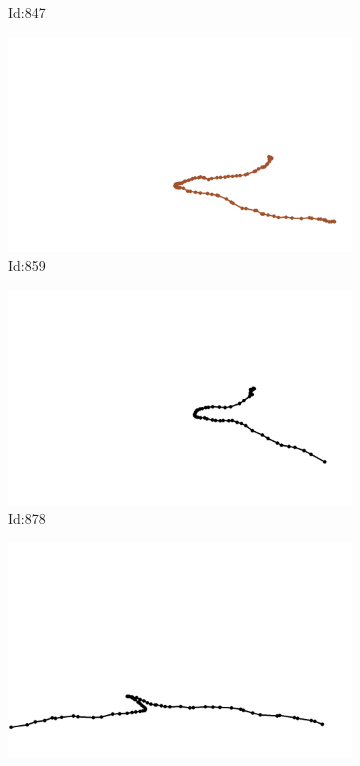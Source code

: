 \documentclass[12pt,twoside]{report}
\begin{document}
\begin{figure}
\begin{subfigure}[b]{0.20\textwidth}
\caption{Id:847}
\end{subfigure}
\begin{subfigure}[b]{0.20\textwidth}
\centering
\includegraphics[width=\textwidth]{../trajectories/859.png}
\caption{Id:859}
\end{subfigure}
\begin{subfigure}[b]{0.20\textwidth}
\centering
\includegraphics[width=\textwidth]{../trajectories/878.png}
\caption{Id:878}
\end{subfigure}
\begin{subfigure}[b]{0.20\textwidth}
\centering
\includegraphics[width=\textwidth]{../trajectories/906.png}

\end{subfigure}
\end{figure}
\end{document}
